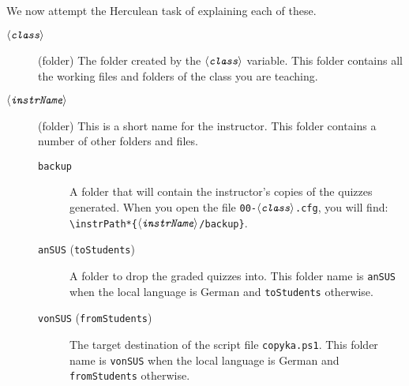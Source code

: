 \documentclass{article}
\def\ameta#1{\ensuremath{\langle\textit{\texttt{#1}}\rangle}}
\begin{document}
We now attempt the Herculean task of explaining each of these.
\begin{description}
  \item[\normalfont\ameta{class}] (folder) The folder created by the \ameta{class} variable. This folder
  contains all the working files and folders of the class you are teaching.
  \item[\normalfont\ameta{instrName}] (folder) This is a short name for the instructor.  This folder contains
  a number of other folders and files.
  \begin{description}
    \item[\normalfont\texttt{backup}] A folder that will contain the
        instructor's copies of the quizzes generated. When
        you open the file \texttt{00-\ameta{class}.cfg}, you
        will find:
        \verb|\instrPath*{|\ameta{instrName}\texttt{/backup}\verb|}|.
    \item[\normalfont\texttt{anSUS} (\texttt{toStudents})] A folder to
        drop the graded quizzes into. This folder name is
        \texttt{anSUS} when the local language is German and
        \texttt{toStudents} otherwise.
    \item[\normalfont\texttt{vonSUS} (\texttt{fromStudents})] The
        target destination of the script file
        \texttt{copyka.ps1}. This folder name is
        \texttt{vonSUS} when the local language is German
        and \texttt{fromStudents} otherwise.


\end{description}
\end{description}
\end{document}
